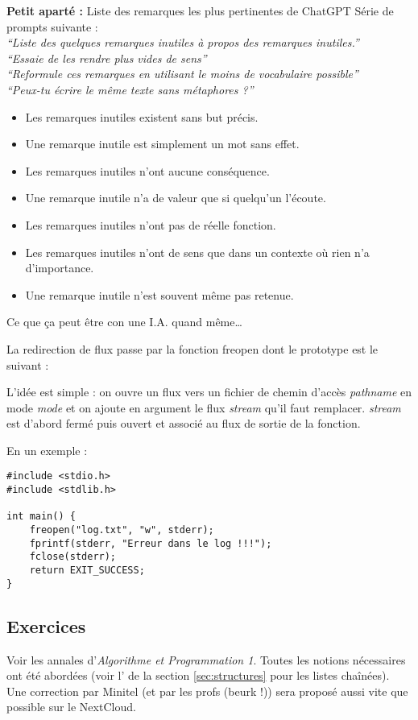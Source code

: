 \documentclass[../../../main.tex]{subfiles}
\begin{document}
\begin{minitelbasicbox}{\textbf{Petit aparté :} Liste des remarques les plus pertinentes de ChatGPT}
Série de prompts suivante : \\
\textit{``Liste des quelques remarques inutiles à propos des remarques inutiles.''}\\
\textit{``Essaie de les rendre plus vides de sens''} \\
\textit{``Reformule ces remarques en utilisant le moins de vocabulaire possible''}\\
\textit{``Peux-tu écrire le même texte sans métaphores ?''}
\begin{itemize}
	\item Les remarques inutiles existent sans but précis.
	\item Une remarque inutile est simplement un mot sans effet.
	\item Les remarques inutiles n'ont aucune conséquence.
	\item Une remarque inutile n'a de valeur que si quelqu'un l'écoute.
	\item Les remarques inutiles n'ont pas de réelle fonction.
	\item Les remarques inutiles n'ont de sens que dans un contexte où rien n'a d'importance.
	\item Une remarque inutile n'est souvent même pas retenue.
\end{itemize}
Ce que ça peut être con une I.A. quand même\dots
\end{minitelbasicbox}
La redirection de flux passe par la fonction \textsf{freopen} dont le prototype est le suivant :
\begin{center}
\end{center}
L'idée est simple : on ouvre un flux vers un fichier de chemin d'accès \textit{pathname} en mode \textit{mode} et on ajoute en argument le flux \textit{stream} qu'il faut remplacer. \textit{stream} est d'abord fermé puis ouvert et associé au flux de sortie de la fonction.
 
En un exemple :
\begin{verbatim}
#include <stdio.h>
#include <stdlib.h>

int main() {
	freopen("log.txt", "w", stderr);
	fprintf(stderr, "Erreur dans le log !!!");
	fclose(stderr);
	return EXIT_SUCCESS;
}
\end{verbatim}
\subsection{Exercices}
Voir les annales d'\textit{Algorithme et Programmation 1}. Toutes les notions nécessaires ont été abordées (voir l' de la section \ref{sec:structures} pour les listes chaînées). Une correction par Minitel (et par les profs (beurk !)) sera proposé aussi vite que possible sur le NextCloud.
\end{document}
